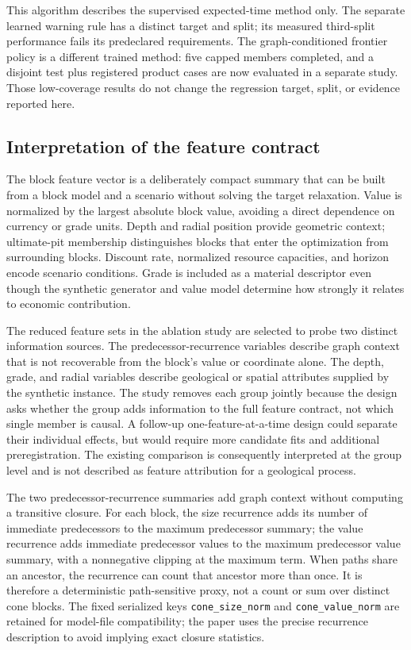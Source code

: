 \documentclass[11pt]{article}
\begin{document}
This algorithm describes the supervised expected-time method only. The separate learned warning rule has a distinct target and split; its measured third-split performance fails its predeclared requirements. The graph-conditioned frontier policy is a different trained method: five capped members completed, and a disjoint test plus registered product cases are now evaluated in a separate study. Those low-coverage results do not change the regression target, split, or evidence reported here.

\subsection{Interpretation of the feature contract}
The block feature vector is a deliberately compact summary that can be built from a block model and a scenario without solving the target relaxation. Value is normalized by the largest absolute block value, avoiding a direct dependence on currency or grade units. Depth and radial position provide geometric context; ultimate-pit membership distinguishes blocks that enter the optimization from surrounding blocks. Discount rate, normalized resource capacities, and horizon encode scenario conditions. Grade is included as a material descriptor even though the synthetic generator and value model determine how strongly it relates to economic contribution.

The reduced feature sets in the ablation study are selected to probe two distinct information sources. The predecessor-recurrence variables describe graph context that is not recoverable from the block's value or coordinate alone. The depth, grade, and radial variables describe geological or spatial attributes supplied by the synthetic instance. The study removes each group jointly because the design asks whether the group adds information to the full feature contract, not which single member is causal. A follow-up one-feature-at-a-time design could separate their individual effects, but would require more candidate fits and additional preregistration. The existing comparison is consequently interpreted at the group level and is not described as feature attribution for a geological process.

The two predecessor-recurrence summaries add graph context without computing a transitive closure. For each block, the size recurrence adds its number of immediate predecessors to the maximum predecessor summary; the value recurrence adds immediate predecessor values to the maximum predecessor value summary, with a nonnegative clipping at the maximum term. When paths share an ancestor, the recurrence can count that ancestor more than once. It is therefore a deterministic path-sensitive proxy, not a count or sum over distinct cone blocks. The fixed serialized keys \texttt{cone\_size\_norm} and \texttt{cone\_value\_norm} are retained for model-file compatibility; the paper uses the precise recurrence description to avoid implying exact closure statistics.
\end{document}
